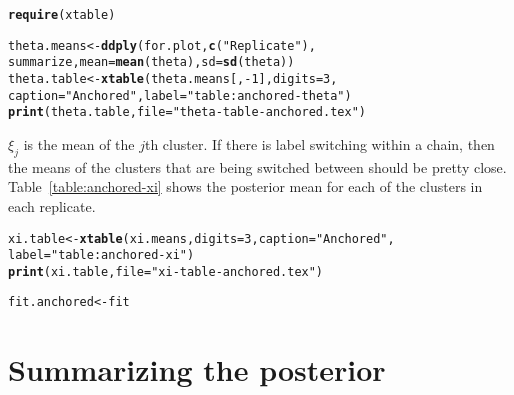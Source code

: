 \documentclass[12pt]{article}\usepackage[]{graphicx}\usepackage[]{color}
\makeatletter
\newcommand{\hlnum}[1]{\textcolor[rgb]{0.686,0.059,0.569}{#1}}%
\newcommand{\hlstr}[1]{\textcolor[rgb]{0.192,0.494,0.8}{#1}}%
\newcommand{\hlopt}[1]{\textcolor[rgb]{0,0,0}{#1}}%
\newcommand{\hlstd}[1]{\textcolor[rgb]{0.345,0.345,0.345}{#1}}%
\newcommand{\hlkwb}[1]{\textcolor[rgb]{0.69,0.353,0.396}{#1}}%
\newcommand{\hlkwc}[1]{\textcolor[rgb]{0.333,0.667,0.333}{#1}}%
\newcommand{\hlkwd}[1]{\textcolor[rgb]{0.737,0.353,0.396}{\textbf{#1}}}%
\newenvironment{kframe}{%
 \def\at@end@of@kframe{}%
 \ifinner\ifhmode%
  \def\at@end@of@kframe{\end{minipage}}%
  \begin{minipage}{\columnwidth}%
 \fi\fi%
 \def\FrameCommand##1{\hskip\@totalleftmargin \hskip-\fboxsep
 \colorbox{shadecolor}{##1}\hskip-\fboxsep
     \hskip-\linewidth \hskip-\@totalleftmargin \hskip\columnwidth}%
 \MakeFramed {\advance\hsize-\width
   \@totalleftmargin\z@ \linewidth\hsize
   \@setminipage}}%
 {\par\unskip\endMakeFramed%
 \at@end@of@kframe}
\newenvironment{knitrout}{}{} %
\makeatother
\begin{document}
\begin{knitrout}
\color{fgcolor}\begin{kframe}
\begin{alltt}
\hlkwd{require}\hlstd{(xtable)}

\hlstd{theta.means} \hlkwb{<-} \hlkwd{ddply}\hlstd{(for.plot,} \hlkwd{c}\hlstd{(}\hlstr{"Replicate"}\hlstd{),}
  \hlstd{summarize,} \hlkwc{mean} \hlstd{=} \hlkwd{mean}\hlstd{(theta),} \hlkwc{sd} \hlstd{=} \hlkwd{sd}\hlstd{(theta))}
\hlstd{theta.table} \hlkwb{<-} \hlkwd{xtable}\hlstd{(theta.means[,} \hlopt{-}\hlnum{1}\hlstd{],} \hlkwc{digits} \hlstd{=} \hlnum{3}\hlstd{,}
  \hlkwc{caption} \hlstd{=} \hlstr{"Anchored"}\hlstd{,} \hlkwc{label} \hlstd{=} \hlstr{"table:anchored-theta"}\hlstd{)}
\hlkwd{print}\hlstd{(theta.table,} \hlkwc{file} \hlstd{=} \hlstr{"theta-table-anchored.tex"}\hlstd{)}
\end{alltt}
\end{kframe}
\end{knitrout}



$\xi_j$ is the mean of the $j$th cluster. If there is label switching
within a chain, then the means of the clusters that are being switched
between should be pretty close. Table~\ref{table:anchored-xi} shows
the posterior mean for each of the clusters in each replicate.

\begin{knitrout}
\color{fgcolor}\begin{kframe}
\begin{alltt}
\hlstd{xi.table} \hlkwb{<-} \hlkwd{xtable}\hlstd{(xi.means,} \hlkwc{digits} \hlstd{=} \hlnum{3}\hlstd{,} \hlkwc{caption} \hlstd{=} \hlstr{"Anchored"}\hlstd{,}
  \hlkwc{label} \hlstd{=} \hlstr{"table:anchored-xi"}\hlstd{)}
\hlkwd{print}\hlstd{(xi.table,} \hlkwc{file} \hlstd{=} \hlstr{"xi-table-anchored.tex"}\hlstd{)}

\hlstd{fit.anchored} \hlkwb{<-} \hlstd{fit}
\end{alltt}
\end{kframe}
\end{knitrout}



\section*{Summarizing the posterior}
\end{document}
